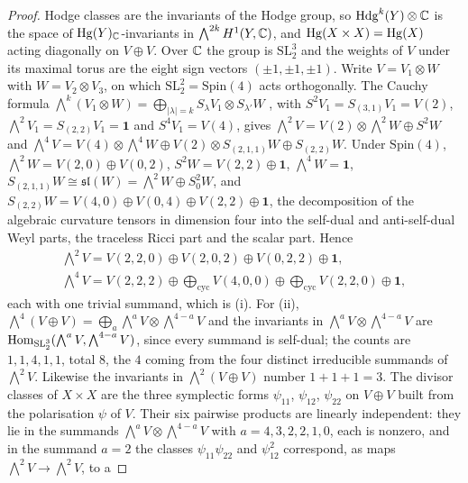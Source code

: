 \begin{proof}
Hodge classes are the invariants of the Hodge group, so
$\mathrm{Hdg}^{k}(Y)\otimes\mathbb{C}$ is the space of $\operatorname{Hg}(Y)_{\mathbb{C}}$-invariants in
$\bigwedge^{2k}H^{1}(Y,\mathbb{C})$, and $\operatorname{Hg}(X\times X)=\operatorname{Hg}(X)$ acting
diagonally on $V\oplus V$. Over $\mathbb{C}$ the group is
$\mathrm{SL}_{2}^{3}$ and the weights of $V$ under its maximal torus are the
eight sign vectors $(\pm1,\pm1,\pm1)$. Write $V=V_{1}\otimes W$ with
$W=V_{2}\otimes V_{3}$, on which $\mathrm{SL}_{2}^{2}=\mathrm{Spin}(4)$ acts
orthogonally. The Cauchy formula
$\bigwedge^{k}(V_{1}\otimes W)=\bigoplus_{|\lambda|=k}S_{\lambda}V_{1}\otimes
S_{\lambda'}W$ \cite[\S6.1]{FH91}, with $S^{2}V_{1}=S_{(3,1)}V_{1}=V(2)$,
$\bigwedge^{2}V_{1}=S_{(2,2)}V_{1}=\mathbf{1}$ and $S^{4}V_{1}=V(4)$, gives
$\bigwedge^{2}V=V(2)\otimes\bigwedge^{2}W\oplus S^{2}W$ and
$\bigwedge^{4}V=V(4)\otimes\bigwedge^{4}W\oplus V(2)\otimes S_{(2,1,1)}W
\oplus S_{(2,2)}W$. Under $\mathrm{Spin}(4)$, $\bigwedge^{2}W=V(2,0)\oplus
V(0,2)$, $S^{2}W=V(2,2)\oplus\mathbf{1}$, $\bigwedge^{4}W=\mathbf{1}$,
$S_{(2,1,1)}W\cong\mathfrak{sl}(W)=\bigwedge^{2}W\oplus S^{2}_{0}W$, and
$S_{(2,2)}W=V(4,0)\oplus V(0,4)\oplus V(2,2)\oplus\mathbf{1}$, the
decomposition of the algebraic curvature tensors in dimension four into the
self-dual and anti-self-dual Weyl parts, the traceless Ricci part and the
scalar part. Hence
\begin{gather*}
  \textstyle\bigwedge^{2}V=V(2,2,0)\oplus V(2,0,2)\oplus V(0,2,2)\oplus\mathbf{1},\\
  \textstyle\bigwedge^{4}V=V(2,2,2)\oplus\bigoplus_{\text{cyc}}V(4,0,0)
  \oplus\bigoplus_{\text{cyc}}V(2,2,0)\oplus\mathbf{1},
\end{gather*}
each with one trivial summand, which is (i). For (ii),
$\bigwedge^{4}(V\oplus V)=\bigoplus_{a}\bigwedge^{a}V\otimes\bigwedge^{4-a}V$
and the invariants in $\bigwedge^{a}V\otimes\bigwedge^{4-a}V$ are
$\operatorname{Hom}_{\mathrm{SL}_{2}^{3}}(\bigwedge^{a}V,\bigwedge^{4-a}V)$, since every
summand is self-dual; the counts are $1,1,4,1,1$, total $8$, the $4$ coming
from the four distinct irreducible summands of $\bigwedge^{2}V$. Likewise the
invariants in $\bigwedge^{2}(V\oplus V)$ number $1+1+1=3$. The divisor
classes of $X\times X$ are the three symplectic forms $\psi_{11}$, $\psi_{12}$,
$\psi_{22}$ on $V\oplus V$ built from the polarisation $\psi$ of $V$. Their
six pairwise products are linearly independent: they lie in the summands
$\bigwedge^{a}V\otimes\bigwedge^{4-a}V$ with $a=4,3,2,2,1,0$, each is
nonzero, and in the summand $a=2$ the classes $\psi_{11}\psi_{22}$ and
$\psi_{12}^{2}$ correspond, as maps $\bigwedge^{2}V\to\bigwedge^{2}V$, to a

\end{proof}
